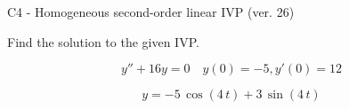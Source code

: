 \begin{exercise}
  \begin{exerciseTitle}C4 - Homogeneous second-order linear IVP (ver. 26)\end{exerciseTitle}
  \begin{exerciseStatement}
    
Find the solution to the given IVP.

    
\[y''+16y = 0 \hspace{1em} y(0) = -5 , y'(0) = 12\]

  \end{exerciseStatement}
  \begin{exerciseAnswer}
    
\[y= -5 \, \cos\left(4 \, t\right) + 3 \, \sin\left(4 \, t\right)\]

  \end{exerciseAnswer}
\end{exercise}